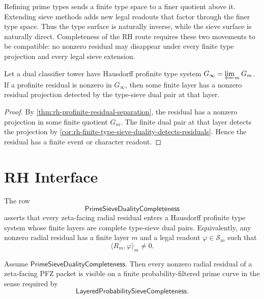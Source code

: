 \begin{principle}
\label{prin:rh-type-refinement-inverse-sieve-extension-direct}
Refining prime types sends a finite type space to a finer quotient
above it.  Extending sieve methods adds new legal readouts that factor
through the finer type space.  Thus the type surface is naturally
inverse, while the sieve surface is naturally direct.  Completeness of
the RH route requires these two movements to be compatible: no nonzero
residual may disappear under every finite type projection and every
legal sieve extension.
\end{principle}

\begin{theorem}
\label{thm:rh-profinite-type-residuals-descend-to-dual-finite-layers}
Let a dual classifier tower have Hausdorff profinite type system
$G_\infty=\varprojlim_mG_m$.  If a profinite residual is nonzero in
$G_\infty$, then some finite layer has a nonzero residual projection
detected by the type-sieve dual pair at that layer.
\end{theorem}

\begin{proof}
By \autoref{thm:rh-profinite-residual-separation}, the residual has a
nonzero projection in some finite quotient $G_m$.  The finite dual pair
at that layer detects the projection by
\autoref{cor:rh-finite-type-sieve-duality-detects-residuals}.  Hence
the residual has a finite event or character readout.
\end{proof}

\section{RH Interface}
\label{sec:rh-prime-sieve-duality-rh-interface}

\begin{definition}[PrimeSieveDualityCompleteness]
\label{def:rh-prime-sieve-duality-completeness}
The row
$$
\mathsf{PrimeSieveDualityCompleteness}
$$
asserts that every zeta-facing radial residual enters a Hausdorff
profinite type system whose finite layers are complete type-sieve dual
pairs.  Equivalently, any nonzero radial residual has a finite layer
$m$ and a legal readout $\varphi\in\mathcal S_m$ such that
$$
\langle R_m,\varphi\rangle_m\ne0.
$$
\end{definition}

\begin{theorem}
\label{thm:rh-prime-sieve-duality-supplies-probability-completeness}
Assume $\mathsf{PrimeSieveDualityCompleteness}$.  Then every nonzero
radial residual of a zeta-facing PFZ packet is visible on a finite
probability-filtered prime curve in the sense required by
$$
\mathsf{LayeredProbabilitySieveCompleteness}.
$$
\end{theorem}


